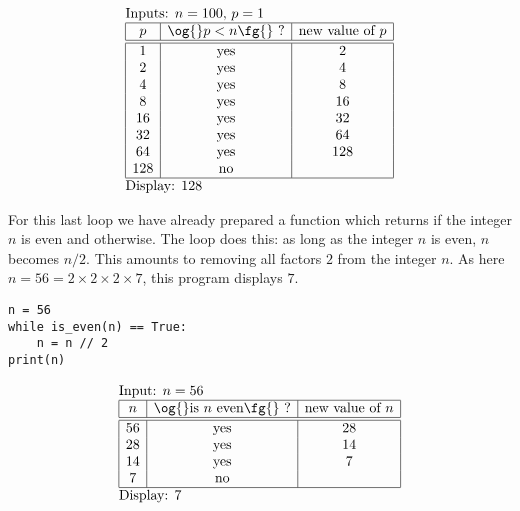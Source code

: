 \documentclass[11pt,class=report,crop=false]{standalone}
\begin{document}
\begin{cours}
\begin{exemple}
  $$
  \begin{array}{l}
  \text{Inputs: $n=100$, $p=1$}    \\
  \begin{array}{|c|c|c|}
  \hline  
  p & \text{\og{}$p < n$\fg{} ?} & \text{new value of } p \\
  \hline\hline 
  1 & \text{yes} & 2 \\
  2 & \text{yes} & 4 \\
  4 & \text{yes} & 8 \\
  8 & \text{yes} & 16 \\  
  16 & \text{yes} & 32 \\
  32 & \text{yes} & 64 \\ 
  64 & \text{yes} & 128 \\   
  128 & \text{no} &  \\     
  \hline
  \end{array} \\
  \text{Display: $128$}  
  \end{array} 
  $$ 
  
\end{exemple}


\begin{exemple}
\begin{minipage}{0.55\textwidth}
For this last loop we have already prepared a function  which returns  if the integer $n$ is even and  otherwise. The loop does this: as long as the integer $n$ is even, $n$ becomes $n/2$. This amounts to removing all factors $2$ from the integer $n$. As here $n = 56 = 2\times 2 \times 2 \times 7$, this program displays $7$.
\end{minipage}\qquad\qquad
\begin{minipage}{0.4\textwidth}
\begin{lstlisting}
n = 56
while is_even(n) == True:
    n = n // 2
print(n)
\end{lstlisting}



\end{minipage}

  $$
  \begin{array}{l}
  \text{Input: $n=56$}    \\
  \begin{array}{|c|c|c|}
  \hline  
  n & \text{\og{}is $n$ even\fg{} ?} & \text{new value of } n \\
  \hline\hline 
  56 & \text{yes} & 28 \\
  28 & \text{yes} & 14 \\
  14 & \text{yes} & 7 \\
  7 & \text{no} &  \\ 
  \hline
  \end{array} \\
  \text{Display: $7$}  
  \end{array} 
  $$ 
\medskip


\end{exemple}
\end{cours}
\end{document}
